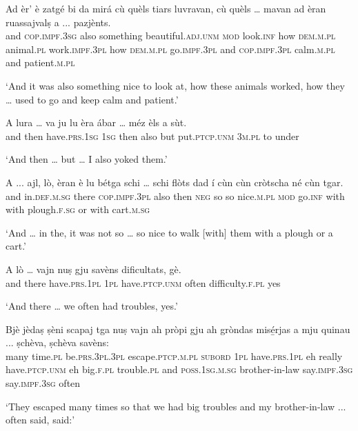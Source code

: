 \begin{linenumbers}
\gll   Ad èr' è zatgé bi da mirá cù quèls tiars luvravan, cù quèls … mavan ad èran ruassajvalṣ a ... pazjènts. \\
and \textsc{cop.impf.3sg} also something beautiful.\textsc{adj.unm} \textsc{mod} look.\textsc{inf} how \textsc{dem.m.pl} animal.\textsc{pl} work.\textsc{impf.3pl} how \textsc{dem.m.pl} {} go.\textsc{impf.3pl} and \textsc{cop.impf.3pl} calm.\textsc{m.pl} and {} patient.\textsc{m.pl}  \\
\end{linenumbers}
\medskip
\glt `And it was also something nice to look at, how these animals worked, how they … used to go and keep calm and patient.'
\medskip

\begin{linenumbers}
\gll   A lura … va ju lu èra ábar … méz èls a sùt. \\
and then {} have.\textsc{prs.1sg} \textsc{1sg} then also but {} put.\textsc{ptcp.unm} \textsc{3m.pl} to under \\
\end{linenumbers}
\medskip
\glt `And then … but … I also yoked them.'
\medskip

\begin{linenumbers}
\gll  A ... ajl, lò, èran è lu bétga schi … schi flòts dad í cùn cùn cròtscha né cùn tgar.\\
and {} in.\textsc{def.m.sg} there \textsc{cop.impf.3pl} also then \textsc{neg} so {} so nice.\textsc{m.pl} \textsc{mod} go.\textsc{inf} with with plough.\textsc{f.sg} or with cart.\textsc{m.sg}\\
\end{linenumbers}
\medskip
\glt `And … in the, it was not so … so nice to walk [with] them with a plough or a cart.'
\medskip

\begin{linenumbers}
\gll  A lò … vajn nuṣ gju savèns dificultats, gè.  \\
and there {} have.\textsc{prs.1pl} \textsc{1pl} have.\textsc{ptcp.unm} often difficulty.\textsc{f.pl} yes\\
\end{linenumbers}
\medskip
\glt `And there … we often had troubles, yes.'
\medskip

\begin{linenumbers}
\gll  Bjè jèdaṣ ṣèni scapaj tga nuṣ vajn ah pròpi gju ah gròndas misé̱rjas a mju quinau ... ṣchèva, ṣchèva savèns:\\
many time.\textsc{pl} be.\textsc{prs.3pl.3pl} escape.\textsc{ptcp.m.pl} \textsc{subord} \textsc{1pl}   have.\textsc{prs.1pl} eh really have.\textsc{ptcp.unm} eh big.\textsc{f.pl} trouble.\textsc{pl} and \textsc{poss.1sg.m.sg}  brother-in-law {} say.\textsc{impf.3sg} say.\textsc{impf.3sg} often\\
\end{linenumbers}
\medskip
\glt `They escaped many times so that we had big troubles and my brother-in-law ... often said, said:'
\medskip

